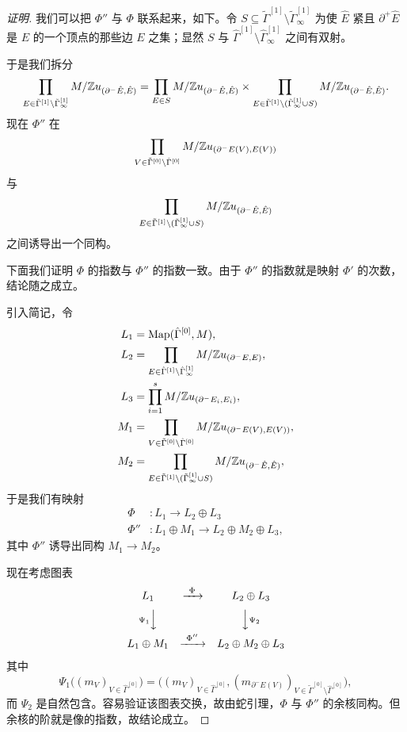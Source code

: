 \begin{proof}[证明]

我们可以把 $\Phi''$ 与 $\Phi$ 联系起来，如下。令 $S\subseteq\tilde\Gamma^{[1]}\setminus\tilde\Gamma^{[1]}_\infty$ 为使 $\hat E$ 紧且 $\partial^+\hat E$ 是 $E$ 的一个顶点的那些边 $E$ 之集；显然 $S$ 与 $\hat\Gamma^{[1]}\setminus\hat\Gamma^{[1]}_\infty$ 之间有双射。

于是我们拆分
\[
\prod_{E\in\tilde\Gamma^{[1]}\setminus\tilde\Gamma^{[1]}_\infty}M/\mathbb{Z} u_{(\partial^-\hat E,\hat E)}=\prod_{E\in S}M/\mathbb{Z} u_{(\partial^-\hat E,\hat E)}\times\prod_{E\in\tilde\Gamma^{[1]}\setminus(\tilde\Gamma^{[1]}_\infty\cup S)}M/\mathbb{Z} u_{(\partial^-\hat E,\hat E)}.
\]
现在 $\Phi''$ 在
\[
\prod_{V\in\tilde\Gamma^{[0]}\setminus\hat\Gamma^{[0]}}M/\mathbb{Z} u_{(\partial^-E(V),E(V))}
\]
与
\[
\prod_{E\in\tilde\Gamma^{[1]}\setminus(\tilde\Gamma^{[1]}_\infty\cup S)}M/\mathbb{Z} u_{(\partial^-\hat E,\hat E)}
\]
之间诱导出一个同构。

下面我们证明 $\Phi$ 的指数与 $\Phi''$ 的指数一致。由于 $\Phi''$ 的指数就是映射 $\Phi'$ 的次数，结论随之成立。

引入简记，令
\begin{align*}
L_1&=\operatorname{Map}(\hat\Gamma^{[0]},M),\\
L_2&=\prod_{E\in\hat\Gamma^{[1]}\setminus\hat\Gamma^{[1]}_\infty}M/\mathbb{Z} u_{(\partial^-E,E)},\\
L_3&=\prod_{i=1}^sM/\mathbb{Z} u_{(\partial^-E_i,E_i)},\\
M_1&=\prod_{V\in\tilde\Gamma^{[0]}\setminus\hat\Gamma^{[0]}}M/\mathbb{Z} u_{(\partial^-E(V),E(V))},\\
M_2&=\prod_{E\in\tilde\Gamma^{[1]}\setminus(\tilde\Gamma^{[1]}_\infty\cup S)}M/\mathbb{Z} u_{(\partial^-\hat E,\hat E)},
\end{align*}
于是我们有映射
\begin{align*}
\Phi&:L_1\to L_2\oplus L_3\\
\Phi''&:L_1\oplus M_1\to L_2\oplus M_2\oplus L_3,
\end{align*}
其中 $\Phi''$ 诱导出同构 $M_1\to M_2$。

现在考虑图表
\begin{equation*}
\begin{array}{ccc}
L_1 & \xrightarrow{\ \Phi\ } & L_2\oplus L_3\\[6pt]
{\scriptstyle\Psi_1}\Big\downarrow & & \Big\downarrow{\scriptstyle\Psi_2}\\[6pt]
L_1\oplus M_1 & \xrightarrow{\ \Phi''\ } & L_2\oplus M_2\oplus L_3
\end{array}
\end{equation*}
其中
\[
\Psi_1\big((m_V)_{V\in\hat\Gamma^{[0]}}\big)=\big((m_V)_{V\in\hat\Gamma^{[0]}},(m_{\partial^-E(V)})_{V\in\tilde\Gamma^{[0]}\setminus\hat\Gamma^{[0]}}\big),
\]
而 $\Psi_2$ 是自然包含。容易验证该图表交换，故由蛇引理，$\Phi$ 与 $\Phi''$ 的余核同构。但余核的阶就是像的指数，故结论成立。
\end{proof}

